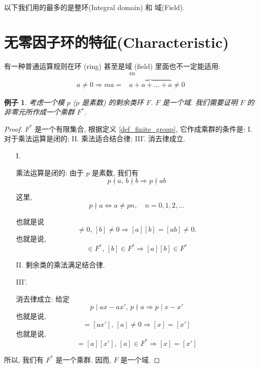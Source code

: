 \documentclass[utf8]{ctexbook}
\newtheorem{example}{例子}[section]
\begin{document}
以下我们用的最多的是整环(Integral domain) 和 域(Field).

\section{无零因子环的特征(Characteristic)}


有一种普通运算规则在环 (ring) 甚至是域 (field) 里面也不一定能适用:
\begin{equation}\label{eq_power_non_zero}
\begin{array}{cc}
 & m \\ 
a \neq 0 \Rightarrow  m a  = & \overbrace{a + a + ... + a} \neq 0 
\end{array}
\end{equation}

\begin{example}\label{example_mod_prime_number_field}
考虑一个模 $p$ ($p$ 是素数) 的剩余类环 $F$. $F$ 是一个域.
我们需要证明 $F$ 的非零元所作成一个乘群 $F^*$.

\end{example}

\begin{proof}
$F^*$ 是一个有限集合, 根据定义 \ref{def_finite_group}, 它作成乘群的条件是: I. 对于乘法运算是闭的; II. 乘法适合结合律; III'. 消去律成立.
\begin{itemize}
\item[I.]{乘法运算是闭的: 由于 $p$ 是素数, 我们有
\begin{equation}
p \nmid a, \, b \nmid b \Rightarrow p \nmid ab
\end{equation}

这里,
\begin{equation}
p \nmid a \iff a \neq p n, \quad n = 0, 1, 2, \ldots
\end{equation}

也就是说
\begin{equation}
[a] \neq 0, \, [b] \neq 0 \Rightarrow [a][b] = [ab] \neq 0 .
\end{equation}
也就是说,
\begin{equation}
[a] \in F^*, \, [b] \in F^* \Rightarrow [a] [b] \in F^*
\end{equation}
}
\item[II.]{剩余类的乘法满足结合律.}
\item[III'.]{消去律成立: 给定
\begin{equation}
p \mid ax - a x' , \, p \nmid a \Rightarrow p \mid x - x' 
\end{equation}
也就是说,
\begin{equation}
[ax] = [ax'] , \, [a] \neq 0 \Rightarrow [x] = [x']
\end{equation}
也就是说,
\begin{equation}
[a][x] = [a] [x'] , \, [a] \in F^* \Rightarrow [x] = [x']
\end{equation}

}
\end{itemize}

所以, 我们有 $F^*$ 是一个乘群. 因而, $F$ 是一个域.
\end{proof}
\end{document}
